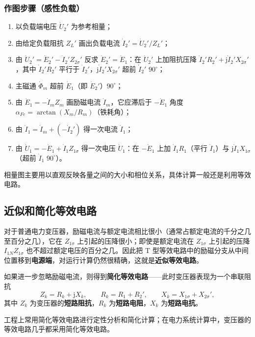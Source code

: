 \subsubsection{作图步骤（感性负载）}
\begin{enumerate}
  \item 以负载端电压 $\dot U_2'$ 为参考相量；
  \item 由给定负载阻抗 $Z_L'$ 画出负载电流 $\dot I_2'=\dot U_2'/Z_L'$；
  \item 由 $\dot U_2'=\dot E_2'-\dot I_2'Z_{2\sigma}'$ 反求 $\dot E_2'=\dot E_1$：在 $\dot U_2'$ 上加阻抗压降 $\dot I_2'R_2'+\mathrm{j}\dot I_2'X_{2\sigma}'$，其中 $\dot I_2'R_2'$ 平行于 $\dot I_2'$，$\mathrm{j}\dot I_2'X_{2\sigma}'$ 超前 $\dot I_2'$ $90^\circ$；
  \item 主磁通 $\dot\Phi_m$ 超前 $\dot E_1$（即 $\dot E_2'$）$90^\circ$；
  \item 由 $\dot E_1=-\dot I_mZ_m$ 画励磁电流 $\dot I_m$，它应滞后于 $-\dot E_1$ 角度 $\alpha_{Fe}=\arctan\left(X_m/R_m\right)$（铁耗角）；
  \item 由 $\dot I_1=\dot I_m+\left(-\dot I_2'\right)$ 得一次电流 $\dot I_1$；
  \item 由 $\dot U_1=-\dot E_1+\dot I_1Z_{1\sigma}$ 得一次电压 $\dot U_1$：在 $-\dot E_1$ 上加 $\dot I_1R_1$（平行 $\dot I_1$）与 $\mathrm{j}\dot I_1X_{1\sigma}$（超前 $\dot I_1$ $90^\circ$）。
\end{enumerate}

相量图主要用以直观反映各量之间的大小和相位关系，具体计算一般还是利用等效电路。

\subsection{近似和简化等效电路}
对于普通电力变压器，励磁电流与额定电流相比很小（通常占额定电流的千分之几至百分之几），它在 $Z_{1\sigma}$ 上引起的压降很小；即使是额定电流在 $Z_{1\sigma}$ 上引起的压降 $I_{1N}Z_{1\sigma}$ 也不超过额定电压的百分之几。因此把 T 型等效电路中的励磁分支从中间位置移到\textbf{电源端}，对运行计算仍然很精确，这就是\textbf{近似等效电路}。

如果进一步忽略励磁电流，则得到\textbf{简化等效电路}——此时变压器表现为一个串联阻抗
\begin{equation}
Z_k=R_k+\mathrm{j}X_k,\qquad R_k=R_1+R_2',\qquad X_k=X_{1\sigma}+X_{2\sigma}' ,
\end{equation}
其中 $Z_k$ 为变压器的\textbf{短路阻抗}，$R_k$ 为\textbf{短路电阻}，$X_k$ 为\textbf{短路电抗}。

工程上常用简化等效电路进行定性分析和简化计算；在电力系统计算中，变压器的等效电路几乎都采用简化等效电路。

